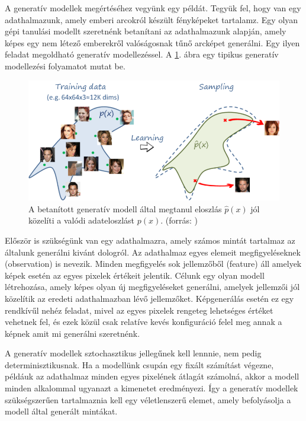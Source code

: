 A generatív modellek megértéséhez vegyünk egy példát. Tegyük fel, hogy van egy adathalmazunk, amely emberi arcokról készült fényképeket tartalamz. Egy olyan gépi tanulási modellt szeretnénk betanítani az adathalmazunk alapján, amely képes egy nem létező emberekről valóságosnak tűnő arcképet generálni. Egy ilyen feladat megoldható generatív modellezéssel. A \ref{fig:generative_model}. ábra egy tipikus generatív modellezési folyamatot mutat be.

\begin{figure}[h]
	\centering
	\includegraphics[width=0.9\columnwidth]{figures/generative_model_struct.png}
	\caption{A betanított generatív modell által megtanul eloszlás $\hat{p}(x)$ jól közelíti a valódi adateloszlást $p(x)$. (forrás: \cite{fig:generative_model_struct})}
	\label{fig:generative_model}
\end{figure}

Először is szükségünk van egy adathalmazra, amely számos mintát tartalmaz az általunk generálni kivánt dologról. Az adathalmaz egyes elemeit megfigyeléseknek (observation) is nevezik. Minden megfigyelés sok jellemzőből (feature) áll amelyek képek esetén az egyes pixelek értékeit jelentik. Célunk egy olyan modell létrehozása, amely képes olyan új megfigyeléseket generálni, amelyek jellemzői jól közelítik az eredeti adathalmazban lévő jellemzőket. Képgenerálás esetén ez egy rendkívűl nehéz feladat, mivel az egyes pixelek rengeteg lehetséges értéket vehetnek fel, és ezek közül csak relatíve kevés konfiguráció felel meg annak a képnek amit mi generálni szeretnénk.

A generatív modellek sztochasztikus jellegűnek kell lennnie, nem pedig determinisztikusnak. Ha a modellünk csupán egy fixált számítást végezne, példáuk az adathalmaz minden egyes pixelének átlagát számolná, akkor a modell minden alkalommal ugyanazt a kimenetet eredményezi. Így a generatív modellek szükségszerűen tartalmaznia kell egy véletlenszerű elemet, amely befolyásolja a modell által generált mintákat.

